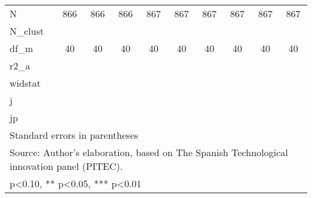 \begin{table}[htbp]
\begin{tabular}{l*{9}{c}}
\hline
N                   &         866   &         866   &         866   &         867   &         867   &         867   &         867   &         867   &         867   \\
N\_clust             &               &               &               &               &               &               &               &               &               \\
df\_m                &          40   &          40   &          40   &          40   &          40   &          40   &          40   &          40   &          40   \\
r2\_a                &               &               &               &               &               &               &               &               &               \\
widstat             &               &               &               &               &               &               &               &               &               \\
j                   &               &               &               &               &               &               &               &               &               \\
jp                  &               &               &               &               &               &               &               &               &               \\
\hline\hline
\multicolumn{10}{l}{\footnotesize Standard errors in parentheses}\\
\multicolumn{10}{l}{\footnotesize Source: Author's elaboration, based on The Spanish Technological innovation panel (PITEC).}\\
\multicolumn{10}{l}{\footnotesize * p<0.10, ** p<0.05, *** p<0.01}\\
\end{tabular}
\end{table}
